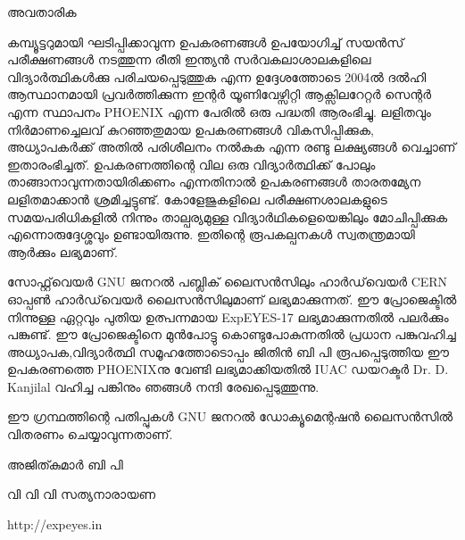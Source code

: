 \documentclass[12pt,a4paper]{report}
\begin{document}
\thispagestyle{empty}


അവതാരിക 

കമ്പ്യൂട്ടറുമായി ഘടിപ്പിക്കാവുന്ന ഉപകരണങ്ങൾ ഉപയോഗിച്ച് സയൻസ് പരീക്ഷണങ്ങൾ നടത്തുന്ന രീതി ഇന്ത്യൻ സർവകലാശാലകളിലെ വിദ്യാർത്ഥികൾക്കു പരിചയപ്പെടുത്തുക എന്ന ഉദ്ദേശത്തോടെ 2004ൽ ദൽഹി ആസ്ഥാനമായി പ്രവർത്തിക്കുന്ന ഇന്റർ യൂണിവേഴ്സിറ്റി ആക്സിലറേറ്റർ സെന്റർ എന്ന സ്ഥാപനം PHOENIX എന്ന പേരിൽ ഒരു പദ്ധതി ആരംഭിച്ചു.  ലളിതവും നിർമാണച്ചെലവ് കുറഞ്ഞതുമായ ഉപകരണങ്ങൾ വികസിപ്പിക്കുക, അധ്യാപകർക്ക് അതിൽ പരിശീലനം നൽകുക എന്ന രണ്ടു ലക്ഷ്യങ്ങൾ വെച്ചാണ് ഇതാരംഭിച്ചത്. ഉപകരണത്തിന്റെ വില ഒരു വിദ്യാർത്ഥിക്ക് പോലും താങ്ങാനാവുന്നതായിരിക്കണം എന്നതിനാൽ ഉപകരണങ്ങൾ താരതമ്യേന ലളിതമാക്കാൻ ശ്രമിച്ചട്ടുണ്ട്. കോളേജുകളിലെ പരീക്ഷണശാലകളുടെ സമയപരിധികളിൽ നിന്നും താല്പര്യമുള്ള വിദ്യാർഥികളെയെങ്കിലും മോചിപ്പിക്കുക എന്നൊരുദ്ദേശ്ശവും ഉണ്ടായിരുന്നു. ഇതിന്റെ രൂപകല്പനകൾ സ്വതന്ത്രമായി ആർക്കും ലഭ്യമാണ്.

സോഫ്റ്റ്‌വെയർ GNU ജനറൽ പബ്ലിക് ലൈസൻസിലും ഹാർഡ്‌വെയർ  CERN ഓപ്പൺ ഹാർഡ്‌വെയർ ലൈസൻസിലുമാണ് ലഭ്യമാക്കുന്നത്. ഈ പ്രോജെക്ടിൽ നിന്നുള്ള ഏറ്റവും പുതിയ ഉത്പന്നമായ ExpEYES-17 ലഭ്യമാക്കുന്നതിൽ പലർക്കും പങ്കുണ്ട്. ഈ പ്രോജെക്ടിനെ മുൻപോട്ടു കൊണ്ടുപോകുന്നതിൽ പ്രധാന പങ്കുവഹിച്ച അധ്യാപക,വിദ്യാർത്ഥി സമൂഹത്തോടൊപ്പം  ജിതിൻ ബി പി രൂപപ്പെടുത്തിയ ഈ ഉപകരണത്തെ PHOENIXനു വേണ്ടി ലഭ്യമാക്കിയതിൽ  IUAC ഡയറക്ടർ Dr. D. Kanjilal വഹിച്ച പങ്കിനും  ഞങ്ങൾ നന്ദി രേഖപ്പെടുത്തുന്നു.

ഈ ഗ്രന്ഥത്തിന്റെ പതിപ്പുകൾ GNU ജനറൽ ഡോക്യൂമെന്റഷൻ ലൈസൻസിൽ വിതരണം ചെയ്യാവുന്നതാണ്.

അജിത്കുമാർ ബി പി 

വി വി വി സത്യനാരായണ 

http://expeyes.in
\end{document}
